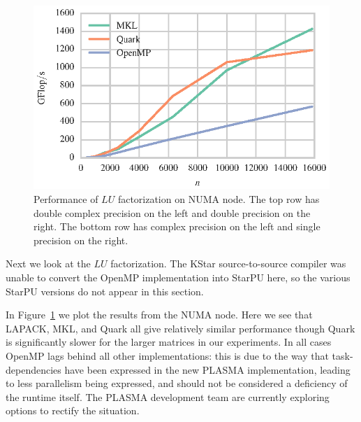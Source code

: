 \documentclass[a4paper,12pt]{article}
\begin{document}
\begin{figure}[t]
  \includegraphics[scale=.85]{fig/kebnekaise_sgetrf_weak_scaling.eps}
  \caption{Performance of $LU$ factorization on NUMA node.
    The top row has double complex precision on the left and double
    precision on the right.
    The bottom row has complex precision on the left and single
    precision on the right.}
  \label{fig.lu_numa}
\end{figure}

Next we look at the $LU$ factorization.
The KStar source-to-source compiler was unable to convert
the OpenMP implementation into StarPU here,
so the various StarPU versions do not appear in this section.

In Figure~\ref{fig.lu_numa} we plot the results from the NUMA node.
Here we see that LAPACK, MKL, and Quark all give
relatively similar performance though
Quark is significantly slower for the larger matrices in our
experiments.
In all cases OpenMP lags behind all other implementations:
this is due to the way that task-dependencies have been expressed
in the new PLASMA implementation,
leading to less parallelism being expressed,
and should not be considered a deficiency of the runtime itself.
The PLASMA development team are currently exploring options
to rectify the situation.
\end{document}

